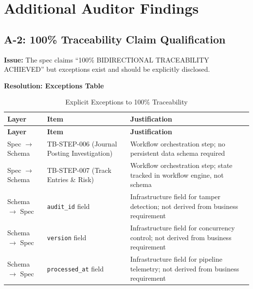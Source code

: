 \section{Additional Auditor Findings}
\label{sec:additional-findings}

\subsection{A-2: 100\% Traceability Claim Qualification}
\label{sec:a2-traceability-exceptions}

\begin{tcolorbox}[colback=orange!5,colframe=orange!70,title=\faIcon{exclamation-circle} Finding A-2: Exceptions to 100\% Traceability]
\textbf{Issue:} The spec claims ``100\% BIDIRECTIONAL TRACEABILITY ACHIEVED'' 
but exceptions exist and should be explicitly disclosed.
\end{tcolorbox}

\textbf{Resolution: Exceptions Table}

\begin{longtable}{p{3cm} p{3.5cm} p{6cm}}
\caption{Explicit Exceptions to 100\% Traceability} \\
\toprule
\textbf{Layer} & \textbf{Item} & \textbf{Justification} \\
\midrule
\endfirsthead
\toprule
\textbf{Layer} & \textbf{Item} & \textbf{Justification} \\
\midrule
\endhead
Spec $\rightarrow$ Schema & TB-STEP-006 (Journal Posting Investigation) & Workflow orchestration step; no persistent data schema required \\
Spec $\rightarrow$ Schema & TB-STEP-007 (Track Entries \& Risk) & Workflow orchestration step; state tracked in workflow engine, not schema \\
Schema $\rightarrow$ Spec & \texttt{audit\_id} field & Infrastructure field for tamper detection; not derived from business requirement \\
Schema $\rightarrow$ Spec & \texttt{version} field & Infrastructure field for concurrency control; not derived from business requirement \\
Schema $\rightarrow$ Spec & \texttt{processed\_at} field & Infrastructure field for pipeline telemetry; not derived from business requirement \\
\bottomrule
\end{longtable}

